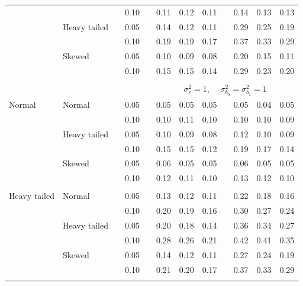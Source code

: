 \documentclass[12pt]{article} %
\begin{document}
\begin{table}[ht]
\begin{scriptsize}
\begin{center}
\begin{tabular}{ll p{.1cm} c p{.1cm} rrr p{.1cm} rrr}
             &              && 0.10 &&  0.11 & 0.12 & 0.11 && 0.14 & 0.13 & 0.13 \\ 
             & Heavy tailed && 0.05 &&  0.14 & 0.12 & 0.11 && 0.29 & 0.25 & 0.19 \\ 
             &              && 0.10 &&  0.19 & 0.19 & 0.17 && 0.37 & 0.33 & 0.29 \\ 
             & Skewed       && 0.05 &&  0.10 & 0.09 & 0.08 && 0.20 & 0.15 & 0.11 \\ 
             &              && 0.10 &&  0.15 & 0.15 & 0.14 && 0.29 & 0.23 & 0.20 \\ 

&&&&&&&&&&&\\
& && && \multicolumn{7}{c}{$\sigma_{\varepsilon}^2 = 1$, \ \ $\sigma_{b_0}^2 = \sigma_{b_1}^2 = 1$} \\ \cline{6-12}
\rowcolor{gray!20}Normal       & Normal       && 0.05 &&  0.05 & 0.05 & 0.05 && 0.05 & 0.04 & 0.05 \\ 
\rowcolor{gray!20}             &              && 0.10 &&  0.10 & 0.11 & 0.10 && 0.10 & 0.10 & 0.09 \\ 
\rowcolor{gray!20}             & Heavy tailed && 0.05 &&  0.10 & 0.09 & 0.08 && 0.12 & 0.10 & 0.09 \\ 
\rowcolor{gray!20}             &              && 0.10 &&  0.15 & 0.15 & 0.12 && 0.19 & 0.17 & 0.14 \\ 
\rowcolor{gray!20}             & Skewed       && 0.05 &&  0.06 & 0.05 & 0.05 && 0.06 & 0.05 & 0.05 \\ 
\rowcolor{gray!20}             &              && 0.10 &&  0.12 & 0.11 & 0.10 && 0.13 & 0.12 & 0.10 \\ 
             &&&&&&&&&&&\\
Heavy tailed & Normal       && 0.05 &&  0.13 & 0.12 & 0.11 && 0.22 & 0.18 & 0.16 \\ 
             &              && 0.10 &&  0.20 & 0.19 & 0.16 && 0.30 & 0.27 & 0.24 \\ 
             & Heavy tailed && 0.05 &&  0.20 & 0.18 & 0.14 && 0.36 & 0.34 & 0.27 \\ 
             &              && 0.10 &&  0.28 & 0.26 & 0.21 && 0.42 & 0.41 & 0.35 \\ 
             & Skewed       && 0.05 &&  0.14 & 0.12 & 0.11 && 0.27 & 0.24 & 0.19 \\ 
             &              && 0.10 &&  0.21 & 0.20 & 0.17 && 0.37 & 0.33 & 0.29 \\ 
             &&&&&&&&&&&\\

\end{tabular}
\end{center}
\end{scriptsize}
\end{table}
\end{document}
